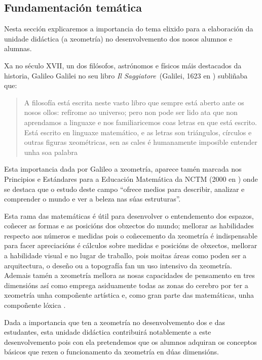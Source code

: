 \subsection{Fundamentación temática}

Nesta sección explicaremos a importancia do tema elixido para a elaboración da unidade didáctica (a xeometría) no desenvolvemento dos nosos alumnos e alumnas.

Xa no século XVII, un dos filósofos, astrónomos e físicos máis destacados da historia, Galileo Galilei no seu libro \emph{Il Saggiatore}~(Galilei, 1623 en ) subliñaba que:
\begin{quote}
\vspace{-0.3\baselineskip}
A filosofía está escrita neste vasto libro que sempre está aberto ante os nosos ollos: refírome ao universo; pero non pode ser lido ata que non aprendamos a linguaxe e nos familiaricemos coas letras en que está escrito. Está escrito en linguaxe matemático, e as letras son triángulos, círculos e outras figuras xeométricas, sen as cales é humanamente imposible entender unha soa palabra
\vspace{-0.6\baselineskip}
\end{quote}

Esta importancia dada por Galileo a xeometría, aparece tamén marcada nos Principios e Estándares para a Educación Matemática da NCTM (2000 en ) onde se destaca que o estudo deste campo ``ofrece medios para describir, analizar e comprender o mundo e ver a beleza nas súas estruturas''.

Esta rama das matemáticas é útil para desenvolver o entendemento dos espazos, coñecer as formas e as posicións dos obxectos do mundo; mellorar as habilidades respecto aos números e medidas pois o coñecemento da xeometría é indispensable para facer apreciacións é cálculos sobre medidas e posicións de obxectos, mellorar a habilidade visual e no lugar de traballo, pois moitas áreas como poden ser a arquitectura, o deseño ou a topografía fan un uso intensivo da xeometría. Ademais tamén a xeometría mellora as nosas capacidades de pensamento en tres dimensións así como emprega asiduamente todas as zonas do cerebro por ter a xeometría unha compoñente artística e, como gran parte das matemáticas, unha compoñente lóxica \cite{shockingreasons}.

Dada a importancia que ten a xeometría no desenvolvemento dos e das estudantes, esta unidade didáctica contribuirá notablemente a este desenvolvemento pois con ela pretendemos que os alumnos adquiran os conceptos básicos que rexen o funcionamento da xeometría en dúas dimensións.
